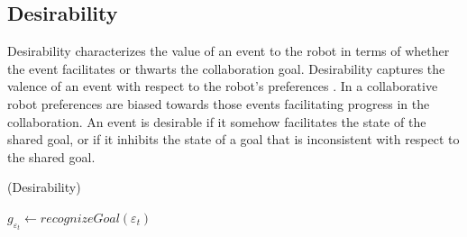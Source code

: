 \documentclass[letterpaper]{article}
\begin{document}
\subsection{Desirability}

Desirability characterizes the value of an event to the robot in terms of
whether the event facilitates or thwarts the collaboration goal. Desirability
captures the valence of an event with respect to the robot's preferences
\cite{gratch:domain-independent}. In a collaborative robot preferences are
biased towards those events facilitating progress in the collaboration. An event
is desirable if it somehow facilitates the state of the shared goal, or if it
inhibits the state of a goal that is inconsistent with respect to the shared
goal.

\begin{algorithm}
	\caption{(Desirability)}
	\label{alg:desirability}
	\begin{algorithmic}[1]
			\Statex
				\State {}
			 \State {}
				\Statex
					\State {}
					\State {}
					\State {}
					\Statex
					\State $\mathit{g}_{\varepsilon_t} \gets
					\textit{recognizeGoal}{(\varepsilon_t)}$
					\Statex
						\State {}
					\EndIf
					\Statex
						\State {}
					\ElsIf {(\textit{{\fontsize{9}{9}\selectfont
}}}
\end{algorithmic}
\end{algorithm}
\end{document}
